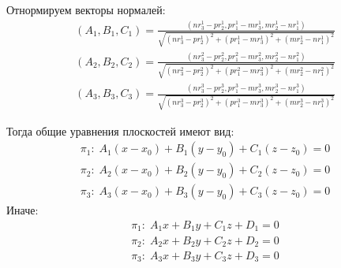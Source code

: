 Отнормируем векторы нормалей:
$$\begin{gathered}
	(A_1, B_1, C_1) = \frac{\left( n r_3^1 - p r_2^1, p r_1^1 - m r_3^1, m r_2^1 - n r_1^1 \right)}{\sqrt{(n r_3^1 - p r_2^1)^2 + (p r_1^1 - m r_3^1)^2 + (m r_2^1 - n r_1^1)^2}} \\
	(A_2, B_2, C_2) = \frac{\left( n r_3^2 - p r_2^2, p r_1^2 - m r_3^2, m r_2^2 - n r_1^2 \right)}{\sqrt{(n r_3^2 - p r_2^2)^2 + (p r_1^2 - m r_3^2)^2 + (m r_2^2 - n r_1^2)^2}} \\
	(A_3, B_3, C_3) = \frac{\left( n r_3^3 - p r_2^3, p r_1^3 - m r_3^3, m r_2^3 - n r_1^3 \right)}{\sqrt{(n r_3^3 - p r_2^3)^2 + (p r_1^3 - m r_3^3)^2 + (m r_2^3 - n r_1^3)^2}}
\end{gathered}$$

Тогда общие уравнения плоскостей имеют вид:
$$\begin{gathered}
	\pi_1: \; A_1 (x - x_0) + B_1 (y - y_0) + C_1 (z - z_0) = 0 \\
	\pi_2: \; A_2 (x - x_0) + B_2 (y - y_0) + C_2 (z - z_0) = 0 \\
	\pi_3: \; A_3 (x - x_0) + B_3 (y - y_0) + C_3 (z - z_0) = 0 
\end{gathered}$$
Иначе:
$$\begin{gathered}
	\pi_1: \; A_1 x + B_1 y + C_1 z + D_1 = 0 \\
	\pi_2: \; A_2 x + B_2 y + C_2 z + D_2 = 0 \\
	\pi_3: \; A_3 x + B_3 y + C_3 z + D_3 = 0
\end{gathered}$$
